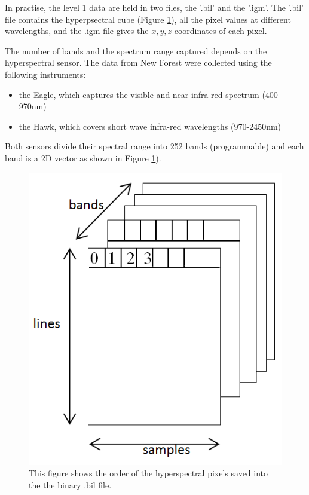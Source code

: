 \documentclass{subfiles}
\begin{document}
In practise, the level 1 data are held in two files, the '.bil' and the '.igm'. The '.bil' file contains the hyperpsectral cube (Figure \ref{fig:hyperspectralCube}), all the pixel values at different wavelengths, and the .igm file gives the $x, y, z$ coordinates of each pixel.  
	
	\par The number of bands and the spectrum range captured depends on the hyperspectral sensor. The data from New Forest were collected using the following instruments:
	\begin{itemize}
		\item the Eagle, which captures the visible and near infra-red spectrum (400-970nm)
		\item the Hawk, which covers short wave infra-red wavelengths (970-2450nm) 
	\end{itemize}
	Both sensors divide their spectral range into 252 bands (programmable) and each band is a 2D vector as shown in Figure \ref{fig:hyperspectralCube}).
	
	\begin{figure}[!htbp]
		\centering
		\includegraphics[width=\textwidth/5*2]{img/HI_bilFile}
		\caption[Hyperpsectral Cube]{This figure shows the order of the hyperspectral pixels saved into the the binary .bil file.}
		\label{fig:hyperspectralCube}
	\end{figure}
	
\end{document}
